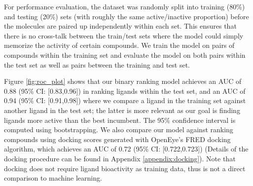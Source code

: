 
For performance evaluation, the dataset was randomly split into training (80\%) and testing (20\%) sets (with roughly the same active/inactive proportion) before the molecules are paired up independently within each set. This ensures that there is no cross-talk between the train/test sets where the model could simply memorize the activity of certain compounds. We train the model on pairs of compounds within the training set and evaluate the model on both pairs within the test set as well as pairs between the training and test set.

Figure \ref{fig:roc_plot} shows that our binary ranking model achieves an AUC of 0.88 (95\% CI: [0.83,0.96]) in ranking ligands within the test set, and an AUC of 0.94 (95\% CI: [0.91,0.98]) where we compare a ligand in the training set against another ligand in the test set; the latter is more relevant as our goal is finding ligands more active than the best incumbent. The 95\% confidence interval is computed using bootstrapping. We also compare our model against ranking compounds using docking scores generated with OpenEye's FRED docking algorithm, which achieves an AUC of 0.72 (95\% CI: [0.722,0.723]) (Details of the docking procedure can be found in Appendix \ref{appendix:docking}). Note that docking does not require ligand bioactivity as training data, thus is not a direct comparison to machine learning.

